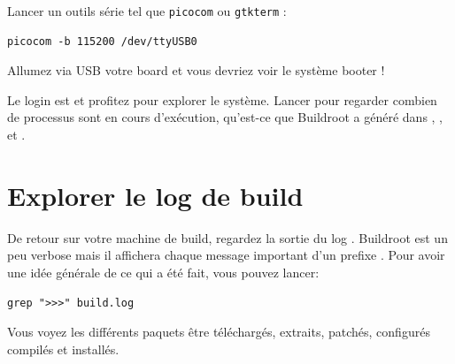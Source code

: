 Lancer un outils série tel que \texttt{picocom} ou \texttt{gtkterm} :

\begin{verbatim}
picocom -b 115200 /dev/ttyUSB0
\end{verbatim}

Allumez via USB votre board et vous devriez voir le système booter !

Le login est  et profitez pour explorer le système. Lancer
 pour regarder combien de processus sont en cours d'exécution,
qu'est-ce que Buildroot a généré dans , , 
et .

\section{Explorer le log de build}

De retour sur votre machine de build, regardez la sortie du log .
Buildroot est un peu verbose mais il affichera chaque message important d'un
prefixe \code{>>>}. Pour avoir une idée générale de ce qui a été fait, vous
pouvez lancer:

\begin{verbatim}
grep ">>>" build.log
\end{verbatim}

Vous voyez les différents paquets être téléchargés, extraits, patchés,
configurés compilés et installés.
